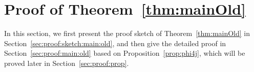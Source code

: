 \documentclass[nohyperref]{article}
\theoremstyle{plain}
\theoremstyle{definition}
\theoremstyle{remark}
\begin{document}
	
	
	
	
	
	
\section{Proof of Theorem~\ref{thm:mainOld}} %
\label{sec:proofMainOld}
In this section, we first present the proof sketch of  Theorem~\ref{thm:mainOld} in Section~\ref{sec:proof:sketch:main:old}, and then give the detailed proof in Section~\ref{sec:proof:main:old} based on Proposition~\ref{prop:phi4j}, which will be proved later in Section~\ref{sec:proof:prop}. 
\end{document}
